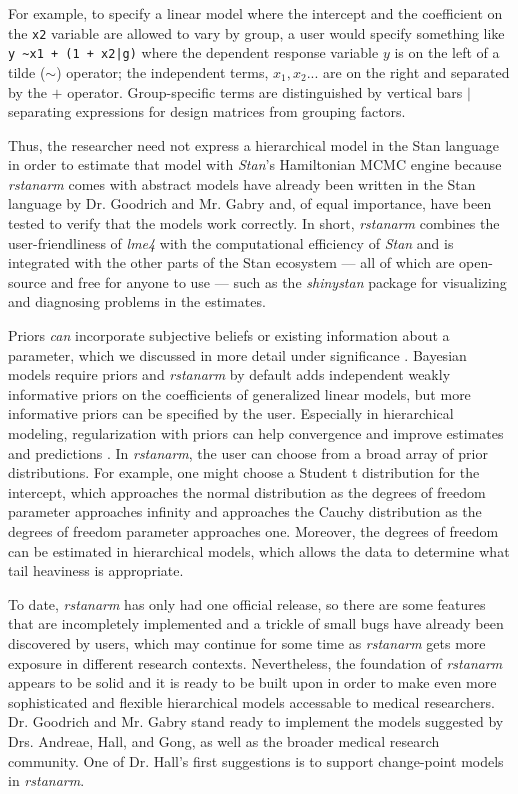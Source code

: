 \documentclass[11pt,notitlepage]{article}
\begin{document}
For example, to specify a linear model where the intercept and the coefficient on the \texttt{x2} 
variable are allowed to vary by group, a user would specify something like \texttt{y \textasciitilde x1 + (1 + x2|g)}
where the dependent response variable $y$ is on the left of a tilde ($\sim$) operator; 
the independent terms, $x_1, x_2...$ are on the right and separated by the $+$ 
operator. Group-specific terms are distinguished by vertical bars $|$ separating expressions for design matrices from grouping factors.

Thus, the researcher need not express a hierarchical model in the Stan language in order to estimate that model with \textit{Stan}'s Hamiltonian
MCMC engine because \textit{rstanarm} comes with abstract models have already been written in the Stan language by 
Dr. Goodrich and Mr. Gabry and, of equal importance, have been tested to verify that the models work correctly. In short, 
\textit{rstanarm} combines the user-friendliness of \textit{lme4} with the 
computational efficiency of \textit{Stan} and is integrated with the other parts of the Stan ecosystem
--- all of which are open-source and free for anyone to use --- such as the \textit{shinystan} package for 
visualizing and diagnosing problems in the estimates.

Priors \textit{can} incorporate subjective beliefs or existing information about a parameter,  
which we discussed in more detail under significance \cite{carlin1997bayes}. 
Bayesian models require priors and \textit{rstanarm} by default 
adds independent weakly informative priors on the coefficients of generalized linear models, 
but more informative priors can be specified by the user. Especially in hierarchical modeling, 
regularization with priors can help convergence and improve estimates and predictions
\cite{Gelman-Hill_2014}. In \textit{rstanarm}, the user can choose from 
a broad array of prior distributions. For example, one might choose a 
Student t distribution for the intercept, which approaches the normal distribution as the 
degrees of freedom parameter approaches infinity and approaches the Cauchy distribution as the
degrees of freedom parameter approaches one. Moreover, the degrees of freedom can be estimated
in hierarchical models, which allows the data to determine what tail heaviness is appropriate.

To date, \textit{rstanarm} has only had one official release, so there are some features that are 
incompletely implemented and a trickle of small bugs have already been discovered by users, which 
may continue for some time as \textit{rstanarm} gets more exposure in different research contexts.
Nevertheless, the foundation of \textit{rstanarm} appears to be solid and it is ready to be built
upon in order to make even more sophisticated and flexible hierarchical models accessable to medical researchers.
Dr. Goodrich and Mr. Gabry stand ready to implement the models suggested by Drs. Andreae, Hall, and 
Gong, as well as the broader medical research community. One of Dr. Hall's first suggestions is to
support change-point models in \textit{rstanarm}.
\end{document}
